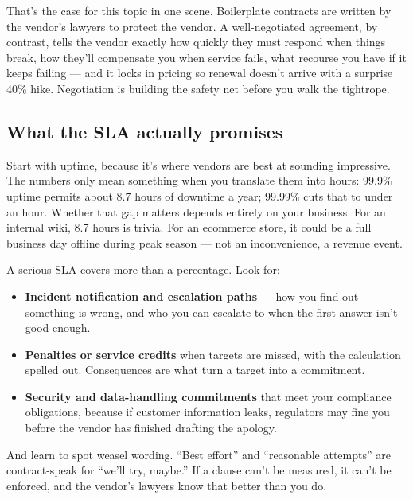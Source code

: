 That's the case for this topic in one scene. Boilerplate contracts are written by the vendor's lawyers to protect the vendor. A well-negotiated agreement, by contrast, tells the vendor exactly how quickly they must respond when things break, how they'll compensate you when service fails, what recourse you have if it keeps failing — and it locks in pricing so renewal doesn't arrive with a surprise 40\% hike. Negotiation is building the safety net before you walk the tightrope.



\subsection{What the SLA actually promises}


Start with uptime, because it's where vendors are best at sounding impressive. The numbers only mean something when you translate them into hours: 99.9\% uptime permits about 8.7 hours of downtime a year; 99.99\% cuts that to under an hour. Whether that gap matters depends entirely on your business. For an internal wiki, 8.7 hours is trivia. For an ecommerce store, it could be a full business day offline during peak season — not an inconvenience, a revenue event.


A serious SLA covers more than a percentage. Look for:


\begin{itemize}[leftmargin=*]
\item \textbf{Incident notification and escalation paths} — how you find out something is wrong, and who you can escalate to when the first answer isn't good enough.
\item \textbf{Penalties or service credits} when targets are missed, with the calculation spelled out. Consequences are what turn a target into a commitment.
\item \textbf{Security and data-handling commitments} that meet your compliance obligations, because if customer information leaks, regulators may fine you before the vendor has finished drafting the apology.
\end{itemize}

And learn to spot weasel wording. ``Best effort'' and ``reasonable attempts'' are contract-speak for ``we'll try, maybe.'' If a clause can't be measured, it can't be enforced, and the vendor's lawyers know that better than you do.



